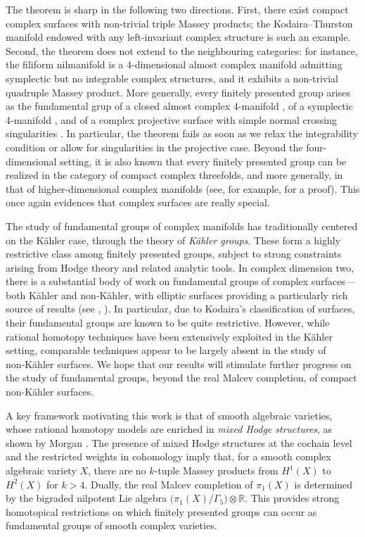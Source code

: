 \documentclass[a4paper]{amsart}
\theoremstyle{definition}
\begin{document}
The theorem is
sharp in the following two directions. First, there exist compact complex surfaces with non-trivial triple Massey products; the Kodaira–Thurston manifold endowed with any left-invariant complex structure is such an example.
Second, the theorem does not extend to the neighbouring categories:
for instance, the filiform nilmanifold is a 4-dimensional almost complex manifold admitting symplectic but no integrable complex structures, and it exhibits a non-trivial quadruple Massey product. More generally, every finitely presented group arises as the fundamental grup of
a closed almost complex 4-manifold \cite{Kot}, of a symplectic 4-manifold \cite{Gompf}, and
of a complex projective surface with simple normal crossing singularities \cite{KaKo}. In particular, the theorem fails as soon as we relax the integrability condition or allow for singularities in the projective case.
Beyond the four-dimensional setting, it is also known that every finitely presented group can be realized in the category of compact complex threefolds, and more generally, in that of higher-dimensional complex manifolds (see, for example, \cite{ABCKT} for a proof). This once again evidences that complex surfaces are really special.

 The study of fundamental groups of complex manifolds has traditionally centered on the Kähler case, through the theory of \emph{Kähler groups}. These form a highly restrictive class among finitely presented groups, subject to strong constraints arising from Hodge theory and related analytic tools. In complex dimension two, there is a substantial body of work on fundamental groups of complex surfaces—both Kähler and non‑Kähler, with elliptic surfaces providing a particularly rich source of results (see \cite{ABCKT}, \cite{FrMo}). In particular,
 due to Kodaira's classification of surfaces, their fundamental groups are known to be quite restrictive.
 However, while rational homotopy techniques have been extensively exploited in the Kähler setting, comparable techniques appear to be largely absent in the study of non‑Kähler surfaces. We hope that our results will stimulate further progress on the study of fundamental groups, beyond the real Malcev completion, of compact non-Kähler surfaces.

 A key framework motivating this work is that of smooth algebraic varieties, whose rational homotopy models are enriched in \emph{mixed Hodge structures}, as shown by Morgan \cite{Morgan}. The presence of mixed Hodge structures at the cochain level and the restricted weights in cohomology imply that, for a smooth complex algebraic variety $X$, there are no $k$-tuple Massey products from $H^1(X)$ to $H^2(X)$ for $k > 4$. Dually, the real Malcev completion of $\pi_1(X)$ is determined by the bigraded nilpotent Lie algebra
$
\bigl(\pi_1(X)/\Gamma_5\bigr) \otimes \mathbb{R}$.
This provides strong homotopical restrictions on which finitely presented groups can occur as fundamental groups of smooth complex varieties.
\end{document}
